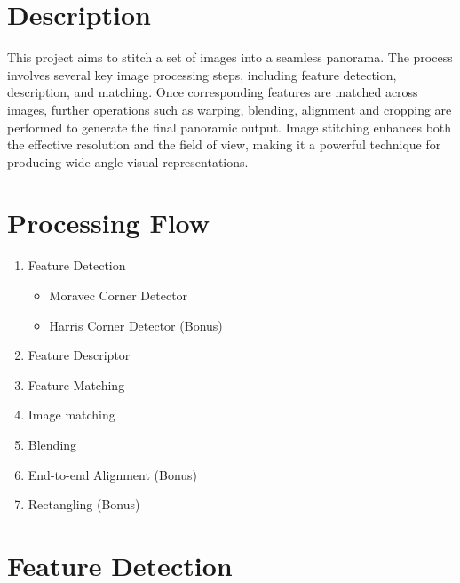 \renewcommand{\author}{張晴昀 (B10902064)\\黃允謙 (B10902067)}
\renewcommand{\title}{Project 2: Image Stitching}
\newcommand{\course}{Digital Visual Effects (NTU CSIE, Spring 2025)}

\renewcommand\tabularxcolumn[1]{>{\Centering}m{#1}}


\maketitle


\section{Description}

This project aims to stitch a set of images into a seamless panorama. The 
process involves several key image processing steps, including feature detection, 
description, and matching. Once corresponding features are matched across images, 
further operations such as warping, blending, alignment and cropping are 
performed to generate the final panoramic output. Image stitching enhances both 
the effective resolution and the field of view, making it a powerful technique 
for producing wide-angle visual representations.


\section{Processing Flow}
\begin{enumerate}
  \item Feature Detection
  \begin{itemize}
    \item Moravec Corner Detector
    \item Harris Corner Detector (Bonus)
  \end{itemize}
  \item Feature Descriptor
  \item Feature Matching
  \item Image matching
  \item Blending
  \item End-to-end Alignment (Bonus)
  \item Rectangling (Bonus)
\end{enumerate}


\section{Feature Detection}
